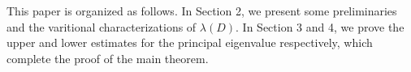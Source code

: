 \documentclass[12pt,reqno]{amsart}
\numberwithin{equation}{section}
\begin{document}
This paper is organized as follows. In Section 2, we present some preliminaries and the varitional characterizations of $\lambda(D)$. In Section 3 and 4, we prove the upper and lower estimates for the principal eigenvalue respectively, which complete the proof of the main theorem. 
\end{document}
